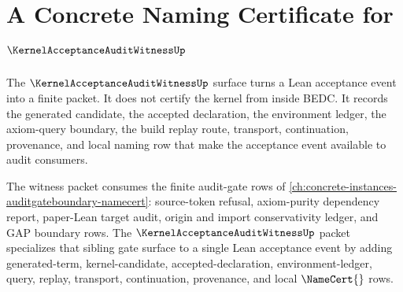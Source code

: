 \chapter{A Concrete Naming Certificate for $\KernelAcceptanceAuditWitnessUp$}
\label{ch:concrete-instances-kernelacceptanceauditwitness-namecert}

The $\KernelAcceptanceAuditWitnessUp$ surface turns a Lean acceptance event into a finite \NameCert{} packet. It does not certify the kernel from inside BEDC. It records the generated candidate, the accepted declaration, the environment ledger, the axiom-query boundary, the build replay route, transport, continuation, provenance, and local naming row that make the acceptance event available to audit consumers.

The witness packet consumes the finite audit-gate rows of \autoref{ch:concrete-instances-auditgateboundary-namecert}: source-token refusal, axiom-purity dependency report, paper-Lean target audit, origin and import conservativity ledger, and GAP boundary rows. The $\KernelAcceptanceAuditWitnessUp$ packet specializes that sibling gate surface to a single Lean acceptance event by adding generated-term, kernel-candidate, accepted-declaration, environment-ledger, query, replay, transport, continuation, provenance, and local $\NameCert{}$ rows.

